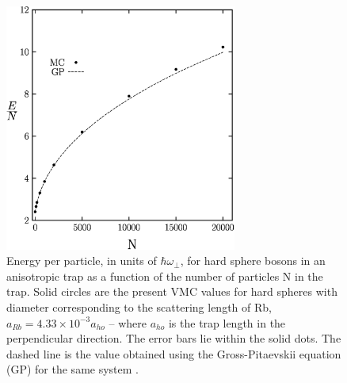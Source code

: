 \documentclass[aps,pra,twocolumn,groupedaddress]{revtex4}
\def\ahop{a_{ho}}
\begin{document}
    \begin{figure}[t]
\begin{center}
\includegraphics[width=3in]{fig2.ps}
\caption{\footnotesize Energy per particle, 
	in units of $\hbar\omega_{\perp}$, for
        hard sphere bosons in an anisotropic trap
        as a function of the number of particles N in the trap.  
	Solid circles are the
        present VMC values for hard spheres with diameter corresponding to
        the scattering length of Rb, $a_{Rb} = 4.33 \times 10^{-3} \ahop$ --
        where $\ahop$ is the trap length in the perpendicular direction.
        The error bars lie within the solid dots.  The dashed line is 
	the value obtained using the Gross-Pitaevskii equation
        (GP) for the same system \cite{dalfovo96}.}
\end{center}
    \end{figure}
\end{document}
